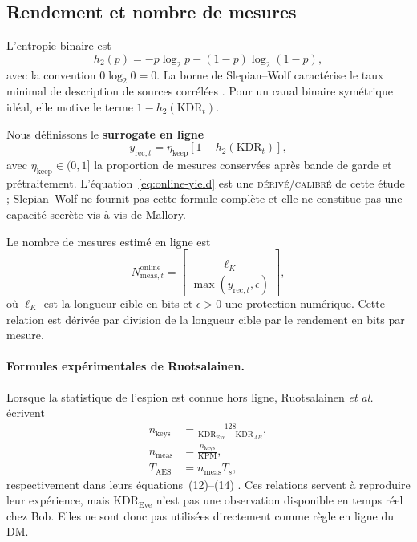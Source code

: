 \documentclass[conference,a4paper]{IEEEtran}
\newcommand{\statusDer}{\textsc{dérivé}}
\newcommand{\statusCal}{\textsc{calibré}}
\newcommand{\KDR}{\mathrm{KDR}}
\begin{document}
\subsection{Rendement et nombre de mesures}
L'entropie binaire est
\begin{equation}
    h_2(p)=-p\log_2p-(1-p)\log_2(1-p),
    \label{eq:binary-entropy}
\end{equation}
avec la convention $0\log_2 0=0$. La borne de Slepian--Wolf caractérise le taux minimal de description de sources corrélées \cite{slepian1973}. Pour un canal binaire symétrique idéal, elle motive le terme $1-h_2(\KDR_t)$.

Nous définissons le \textbf{surrogate en ligne}
\begin{equation}
    y_{\mathrm{rec},t}=\eta_{\mathrm{keep}}
    \left[1-h_2(\KDR_t)\right],
    \label{eq:online-yield}
\end{equation}
avec $\eta_{\mathrm{keep}}\in(0,1]$ la proportion de mesures conservées après bande de garde et prétraitement. L'équation~\eqref{eq:online-yield} est une \statusDer{}/\statusCal{} de cette étude ; Slepian--Wolf ne fournit pas cette formule complète et elle ne constitue pas une capacité secrète vis-à-vis de Mallory.

Le nombre de mesures estimé en ligne est
\begin{equation}
    N_{\mathrm{meas},t}^{\mathrm{online}}=
    \left\lceil\frac{\ell_K}{\max(y_{\mathrm{rec},t},\epsilon)}\right\rceil,
    \label{eq:nmeas-online}
\end{equation}
où $\ell_K$ est la longueur cible en bits et $\epsilon>0$ une protection numérique. Cette relation est dérivée par division de la longueur cible par le rendement en bits par mesure.

\paragraph{Formules expérimentales de Ruotsalainen.}
Lorsque la statistique de l'espion est connue hors ligne, Ruotsalainen \emph{et al.} écrivent
\begin{align}
    n_{\mathrm{keys}}&=\frac{128}{\KDR_{\mathrm{Eve}}-\KDR_{AB}},
    \label{eq:ruotsalainen-nkeys}\\
    n_{\mathrm{meas}}&=\frac{n_{\mathrm{keys}}}{\mathrm{KPM}},
    \label{eq:ruotsalainen-nmeas}\\
    T_{\mathrm{AES}}&=n_{\mathrm{meas}}T_s,
    \label{eq:ruotsalainen-taes}
\end{align}
respectivement dans leurs équations~(12)--(14) \cite[Sec.~V-C, Eqs.~(12)--(14)]{ruotsalainen2020}. Ces relations servent à reproduire leur expérience, mais $\KDR_{\mathrm{Eve}}$ n'est pas une observation disponible en temps réel chez Bob. Elles ne sont donc pas utilisées directement comme règle en ligne du DM.
\end{document}
